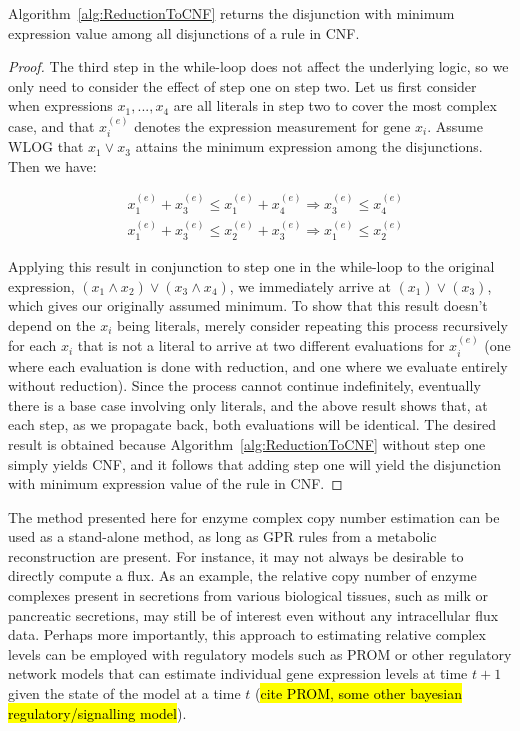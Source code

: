 \begin{methods}
\begin{Theorem}
\label{thm:ReductionToCNF}
Algorithm~\ref{alg:ReductionToCNF} returns the disjunction with
minimum expression value among all disjunctions of a rule in CNF.
\end{Theorem}

\begin{proof}
The third step in the while-loop does not affect the
underlying logic, so we only need to consider the effect of step one
on step two.  Let us first consider when expressions $x_1, ..., x_4$
are all literals in step two to cover the most complex case, and that
$x_i^{(e)}$ denotes the expression measurement for gene $x_i$. Assume
WLOG that $x_1 \lor x_3$ attains the minimum expression among the
disjunctions. Then we have:

\begin{align*}
&x_{1}^{(e)} + x_{3}^{(e)} \leq x_{1}^{(e)} + x_{4}^{(e)} \Rightarrow x_{3}^{(e)} \leq x_{4}^{(e)} \\
&x_{1}^{(e)} + x_{3}^{(e)} \leq x_{2}^{(e)} + x_{3}^{(e)} \Rightarrow x_{1}^{(e)} \leq x_{2}^{(e)} 
\end{align*}

Applying this result in conjunction to step one in the while-loop to
the original expression, $(x_1 \land x_2) \lor (x_3 \land x_4)$, we
immediately arrive at $(x_1) \lor (x_3)$, which gives our originally
assumed minimum. To show that this result doesn't depend on the $x_i$
being literals, merely consider repeating this process recursively for
each $x_i$ that is not a literal to arrive at two different
evaluations for $x_i^{(e)}$ (one where each evaluation is done with reduction, 
and one where we evaluate entirely without reduction). 
Since the process cannot continue
indefinitely, eventually there is a base case involving only literals,
and the above result shows that, at each step, as we propagate back,
both evaluations will be identical. The desired result is obtained
because Algorithm~\ref{alg:ReductionToCNF} without step one simply yields CNF,
and it follows that adding step one will yield the disjunction with 
minimum expression value of the rule in CNF.
\end{proof}

The method presented here for enzyme complex copy number estimation
can be used as a stand-alone method, as long as GPR rules from a
metabolic reconstruction are present. For instance, it may not always
be desirable to directly compute a flux. As an example, the relative
copy number of enzyme complexes present in secretions from various
biological tissues, such as milk or pancreatic secretions, may still
be of interest even without any intracellular flux data.  Perhaps more
importantly, this approach to estimating relative complex levels can
be employed with regulatory models such as PROM or other regulatory
network models that can estimate individual gene expression levels at
time $t+1$ given the state of the model at a time $t$ (\hl{cite PROM,
some other bayesian regulatory/signalling model}).


\end{methods}
